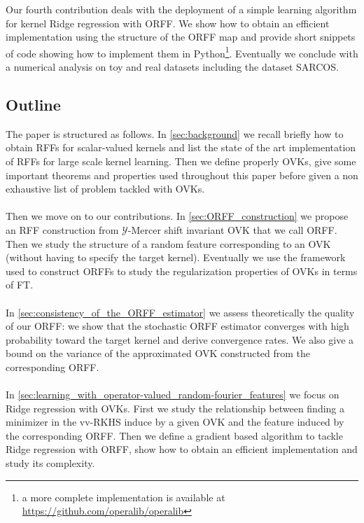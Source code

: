 \documentclass[twoside,11pt]{article}
\begin{document}
Our fourth contribution deals with the deployment of a simple learning algorithm for kernel Ridge
regression with \acs{ORFF}. We show how to obtain an efficient implementation
using the structure of the \acs{ORFF} map and provide short snippets of code
showing how to implement them in Python\footnote{a more complete implementation
is available at \url{https://github.com/operalib/operalib}}. Eventually we
conclude with a numerical analysis on toy and real datasets including the dataset SARCOS.

\subsection{Outline}
The paper is structured as follows. In \cref{sec:background} we recall briefly
how to obtain \acp{RFF} for scalar-valued kernels and list the state of the
art implementation of \acp{RFF} for large scale kernel learning. Then we
define
properly \aclp{OVK}, give some important theorems and properties used
throughout this paper before given a non exhaustive list of problem tackled
with \acsp{OVK}.
\paragraph{}
Then we move on to our contributions. In \cref{sec:ORFF_construction} we
propose an \acs{RFF} construction from $\mathcal{Y}$-Mercer shift invariant
\acs{OVK} that we call \acf{ORFF}. Then we study the structure of a random
feature corresponding to an \acs{OVK} (without having to specify the target
kernel). Eventually we use the framework used to construct \acsp{ORFF} to study
the regularization properties of \acsp{OVK} in terms of \acl{FT}.
\paragraph{}
In \cref{sec:consistency_of_the_ORFF_estimator} we assess theoretically the
quality of our \acs{ORFF}: we show that the stochastic \acs{ORFF} estimator
converges with high probability toward the target kernel and derive convergence
rates. We also give a bound on the variance of the approximated \acs{OVK}
constructed from the corresponding \acs{ORFF}.
\paragraph{}
In \cref{sec:learning_with_operator-valued_random-fourier_features} we focus on
Ridge regression with \acsp{OVK}. First we study the relationship between
finding a minimizer in the \acs{vv-RKHS} induce by a given \acs{OVK} and the
feature induced by the corresponding \acs{ORFF}. Then we define a gradient
based algorithm to tackle Ridge regression with \acs{ORFF}, show how to
obtain an efficient implementation and study its complexity.
\end{document}
